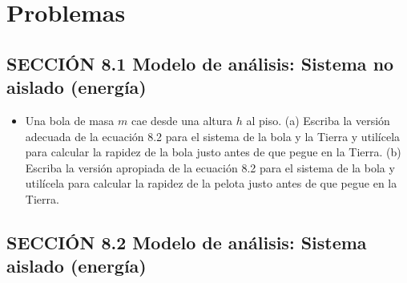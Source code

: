 \documentclass[11pt,a4paper]{article}
\begin{document}
\newpage

\section*{Problemas}

\subsection*{SECCIÓN 8.1 Modelo de análisis: Sistema no aislado (energía)}

\begin{itemize}
    \item[\textbf{1.}] Una bola de masa $m$ cae desde una altura $h$ al piso. (a) Escriba la versión adecuada de la ecuación 8.2 para el sistema de la bola y la Tierra y utilícela para calcular la rapidez de la bola justo antes de que pegue en la Tierra. (b) Escriba la versión apropiada de la ecuación 8.2 para el sistema de la bola y utilícela para calcular la rapidez de la pelota justo antes de que pegue en la Tierra.
    \vspace*{6cm}
\end{itemize}

\subsection*{SECCIÓN 8.2 Modelo de análisis: Sistema aislado (energía)}
\end{document}
